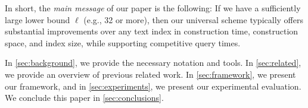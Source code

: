 

\return
In short, the \emph{main message} of our paper is the following:
If we have a sufficiently large lower bound $\ell$ (e.g., 32 or more), then our universal scheme typically offers substantial improvements over any text index in construction time, construction space, and index size, while supporting competitive query times.

In \cref{sec:background}, we provide the necessary notation and tools.
In \cref{sec:related}, we provide an overview of previous related work.
In \cref{sec:framework}, we present our framework, and
in \cref{sec:experiments}, we present our experimental evaluation.
We conclude this paper in \cref{sec:conclusions}.
